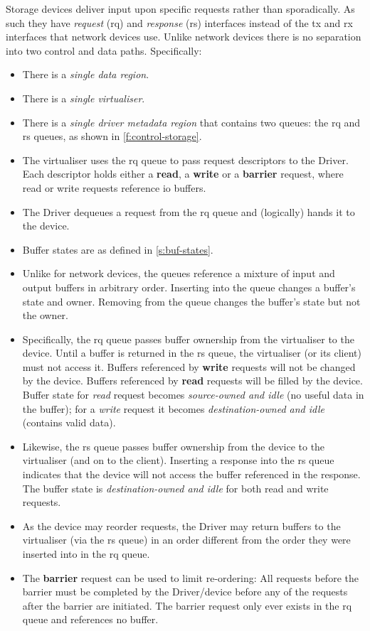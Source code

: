 \documentclass[a4paper,12pt]{report}
\begin{document}
Storage devices deliver input upon specific requests rather than
sporadically. As such they have \emph{request} (\gls{rq}) and
\emph{response} (\gls{rs})
interfaces instead of the \gls{tx} and \gls{rx} interfaces that network devices
use. Unlike network devices there is no separation into two control
and data paths. Specifically:
\begin{itemize}
\item There is a \emph{single data region}.
\item There is a \emph{single virtualiser}.
\item  There is a \emph{single driver metadata region} that contains two queues: the \gls{rq} and
  \gls{rs} queues, as shown in \autoref{f:control-storage}.
\item The virtualiser uses the \gls{rq} queue to pass request descriptors to the
  Driver. Each descriptor holds either a \textbf{read}, a
  \textbf{write} or a \textbf{barrier} request, where read or write
  requests reference \gls{io} buffers.
\item The Driver dequeues a request from the \gls{rq} queue and (logically)
  hands it to the device.
\item Buffer states are as defined in
  \autoref{s:buf-states}.
\item Unlike for network devices, the queues reference a mixture of input
  and output buffers in arbitrary order. Inserting into the queue
  changes a buffer's state and owner. Removing from the queue changes
  the buffer's state but not the owner.
\item Specifically, the \gls{rq} queue passes buffer ownership from the
  virtualiser to the device. Until a buffer is returned in the \gls{rs} queue,
  the virtualiser (or its client) must not access it.  Buffers referenced by \textbf{write}
  requests will not be changed by the device.  Buffers referenced by
  \textbf{read} requests will be filled by the device.
  Buffer state for \emph{read} request becomes \emph{source-owned and idle} (no
  useful data in the buffer); for a \emph{write} request it becomes \emph{destination-owned
  and idle} (contains valid data).

\item Likewise, the \gls{rs} queue passes buffer ownership from the device
  to the virtualiser (and on to the client). Inserting a response into the \gls{rs} queue indicates that
  the device will not access the buffer referenced in the response.
  The buffer state is \emph{destination-owned and idle} for both read and
  write requests.
\item As the device may reorder requests, the Driver may return buffers to
  the virtualiser (via the \gls{rs} queue) in an order different from the order
  they were inserted into in the \gls{rq} queue.
\item The \textbf{barrier} request can be used to limit
  re-ordering: All requests before the barrier must be completed by
  the Driver/device before any of the requests after the barrier are
  initiated. The barrier request only ever exists in the \gls{rq} queue and
  references no buffer.
\end{itemize}
\end{document}
